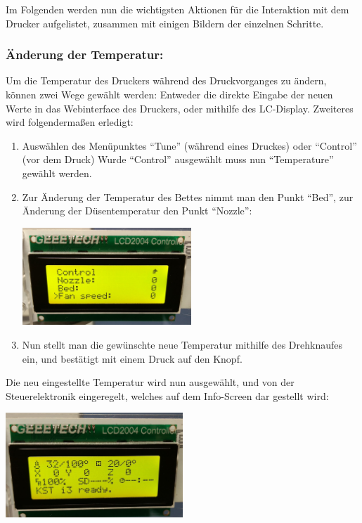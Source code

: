 Im Folgenden werden nun die wichtigsten Aktionen für die Interaktion mit dem Drucker aufgelistet, zusammen mit einigen Bildern der einzelnen Schritte.
\subsubsection{Änderung der Temperatur:}
Um die Temperatur des Druckers während des Druckvorganges zu ändern, können zwei Wege gewählt werden: Entweder die direkte Eingabe der neuen Werte in das Webinterface des Druckers, oder mithilfe des LC-Display. Zweiteres wird folgendermaßen erledigt:
\begin{enumerate}[noitemsep]
\item Auswählen des Menüpunktes "`Tune"' (während eines Druckes) oder "`Control"' (vor dem Druck)
\subitem Wurde "`Control"' ausgewählt muss nun "`Temperature"' gewählt werden.
\item Zur Änderung der Temperatur des Bettes nimmt man den Punkt "`Bed"', zur Änderung der Düsentemperatur den Punkt "`Nozzle"':\\
\begin{center}\includegraphics[width=0.5\textwidth]{Bilder/Tutorial/IMG_20161101_143633204.jpg}\end{center}
\item Nun stellt man die gewünschte neue Temperatur mithilfe des Drehknaufes ein, und bestätigt mit einem Druck auf den Knopf.
\end{enumerate}
Die neu eingestellte Temperatur wird nun ausgewählt, und von der Steuerelektronik eingeregelt, welches auf dem Info-Screen dar gestellt wird:\\
\begin{center}\includegraphics[width=0.5\textwidth]{Bilder/Tutorial/IMG_20161101_143426156.jpg}\end{center}
